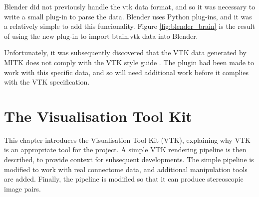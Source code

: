 \documentclass[MSc,paper=a4,pagesize=auto]{icldt}
\begin{document}
Blender did not previously handle the vtk data format, and so it was necessary to write a small plug-in to parse the data. Blender uses Python plug-ins, and it was a relatively simple to add this funcionality. Figure \ref{fig:blender_brain} is the result of using the new plug-in to import btain.vtk data into Blender.  

%

Unfortunately, it was subsequently discovered that the VTK data generated by MITK does not comply with the VTK style guide \cite{VTK_file_formats}. The plugin had been made to work with this specific data, and so will need additional work before it complies with the VTK specification. 

\chapter{The Visualisation Tool Kit}
This chapter introduces the Visualisation Tool Kit (VTK), explaining why VTK is an appropriate tool for the project. A simple VTK rendering pipeline is then described, to provide context for subsequent developments. The simple pipeline is modified to work with real connectome data, and additional manipulation tools are added. Finally, the pipeline is modified so that it can produce stereoscopic image pairs.
\end{document}
